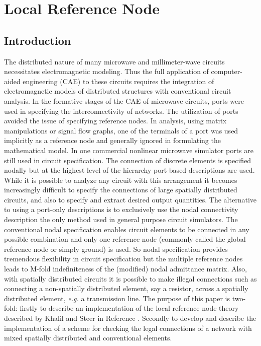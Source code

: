 
\chapter{Local Reference Node} \label{ch_local}


\section{Introduction}

The distributed nature of many microwave and millimeter-wave circuits
necessitates electromagnetic modeling. Thus the full application of
computer-aided engineering (CAE) to these circuits requires the
integration of electromagnetic models of distributed structures with
conventional circuit analysis. In the formative stages of the CAE of
microwave circuits, ports were used in specifying the
interconnectivity of networks.  The utilization of ports avoided the
issue of specifying reference nodes.  In analysis, using matrix
manipulations or signal flow graphs, one of the terminals of a port
was used implicitly as a reference node and generally ignored in
formulating the mathematical model.  In one commercial nonlinear
microwave simulator ports are still used in circuit specification.
The connection of discrete elements is specified nodally but at the
highest level of the hierarchy port-based descriptions are used. While
it is possible to analyze any circuit with this arrangement it becomes
increasingly difficult to specify the connections of large spatially
distributed circuits, and also to specify and extract desired output
quantities.  The alternative to using a port-only descriptions is to
exclusively use the nodal connectivity description the only method
used in general purpose circuit simulators.  The conventional nodal
specification enables circuit elements to be connected in any possible
combination and only one reference node (commonly called the global
reference node or simply ground) is used.  So nodal specification
provides tremendous flexibility in circuit specification but the
multiple reference nodes leads to M-fold indefiniteness of the
(modified) nodal admittance matrix.  Also, with spatially distributed
circuits it is possible to make illegal connections such as connecting
a non-spatially distributed element, say a resistor, across a
spatially distributed element, \emph{e.g.} a transmission line.  The
purpose of this paper is two-fold: firstly to describe an
implementation of the local reference node theory described by Khalil
and Steer in Reference .  Secondly to develop and describe the
implementation of a scheme for checking the legal connections of a
network with mixed spatially distributed and conventional elements.



